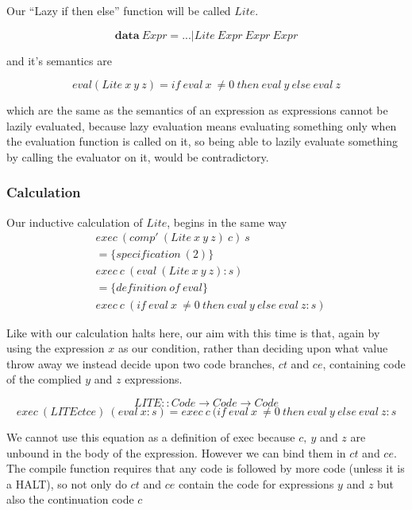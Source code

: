\documentclass {article}
\begin{document}
\newcommand{\lite}{$Lite$}

Our ``Lazy if then else'' function
 will be called \lite.

	\[ \textbf{data} \ Expr = ... | Lite \ Expr \ Expr \ Expr \]

and it's semantics are

	\[eval(Lite \ x \ y \ z) = if \ eval \ x \ \not= 0 \ then \ eval \ y \ else \ eval \ z \]

which are the same as the semantics
of an \ite expression as 
expressions cannot be lazily evaluated,
because lazy evaluation means evaluating
something only when the evaluation function
is called on it,
so being able to lazily evaluate something 
by calling the evaluator on it,
would be contradictory.

\subsubsection{Calculation}

Our inductive calculation of \lite ,
begins in the same way
\begin{align*}
	&exec \ (comp' \ (Lite \ x \ y \ z) \ c) \ s \\
	&= \{specification \ (2) \} \\
	&exec \ c \ (eval \ (Lite \ x \ y \ z) : s) \\
	&= \{definition \ of \ eval\} \\
	&exec \ c \ (if \ eval \ x \ \not= 0 \ then \ eval \ y \ else \ eval \ z : s)
\end{align*}

Like with \ite our calculation halts here,
our aim with this time is that, again by using
the expression $x$ as our condition,
rather than deciding upon what value throw away
we instead decide upon two code branches, $ct$ and $ce$,
containing code of the complied $y$ and $z$ expressions.

	\[ LITE :: Code \rightarrow Code \rightarrow Code \]
	\[ exec \ (LITE ct ce) \ (eval \ x:s) = exec \ c \ (if \ eval \ x \ \not= 0 \ then \ eval \ y \ else \ eval \ z : s  \]

We cannot use this equation as a definition of exec 
because $c, \ y$ and $z$ are unbound in the 
body of the expression\cite[page 10]{bandh}.
However we can bind them in $ct$ and $ce$.
The compile function \compp requires that any code is followed by
more code (unless it is a HALT),
so not only do  $ct$ and $ce$ contain the code for expressions
 $y$ and $z$ but also the continuation code $c$
\end{document}
